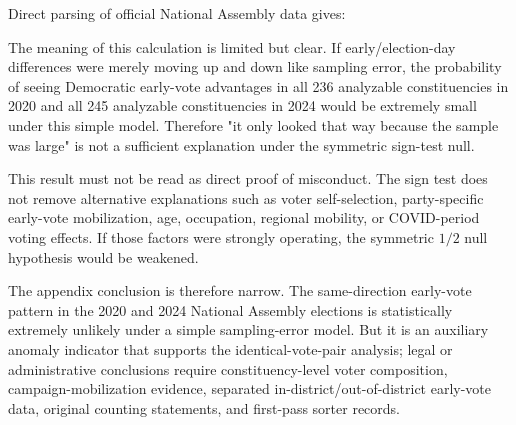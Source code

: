 \documentclass[preprint]{IEIE}
\begin{document}
Direct parsing of official National Assembly data gives:

\begin{center}
\scriptsize
{}
\end{center}

The meaning of this calculation is limited but clear. If early/election-day differences were merely moving up and down like sampling error, the probability of seeing Democratic early-vote advantages in all 236 analyzable constituencies in 2020 and all 245 analyzable constituencies in 2024 would be extremely small under this simple model. Therefore "it only looked that way because the sample was large" is not a sufficient explanation under the symmetric sign-test null.

This result must not be read as direct proof of misconduct. The sign test does not remove alternative explanations such as voter self-selection, party-specific early-vote mobilization, age, occupation, regional mobility, or COVID-period voting effects. If those factors were strongly operating, the symmetric \(1/2\) null hypothesis would be weakened.

The appendix conclusion is therefore narrow. The same-direction early-vote pattern in the 2020 and 2024 National Assembly elections is statistically extremely unlikely under a simple sampling-error model. But it is an auxiliary anomaly indicator that supports the identical-vote-pair analysis; legal or administrative conclusions require constituency-level voter composition, campaign-mobilization evidence, separated in-district/out-of-district early-vote data, original counting statements, and first-pass sorter records.
\end{document}
